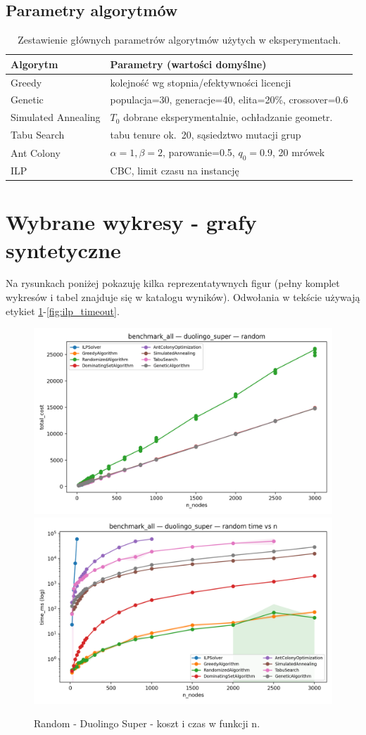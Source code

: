 \subsection*{Parametry algorytmów}
\begin{table}[h]
\centering
\begin{tabular}{@{}ll@{}}
\toprule
Algorytm & Parametry (wartości domyślne) \\
\midrule
Greedy & kolejność wg stopnia/efektywności licencji \\
Genetic & populacja=30, generacje=40, elita=20\%, crossover=0.6 \\
Simulated Annealing & $T_0$ dobrane eksperymentalnie, ochładzanie geometr. \\
Tabu Search & tabu tenure ok.~20, sąsiedztwo mutacji grup \\
Ant Colony & $\alpha=1,\beta=2$, parowanie=0.5, $q_0=0.9$, 20 mrówek \\
ILP & CBC, limit czasu na instancję \\
\bottomrule
\end{tabular}
\caption{Zestawienie głównych parametrów algorytmów użytych w eksperymentach.}
\label{tab:algo_params}
\end{table}

\section{Wybrane wykresy - grafy syntetyczne}
Na rysunkach poniżej pokazuję kilka reprezentatywnych figur (pełny komplet wykresów i tabel znajduje się w katalogu wyników). Odwołania w tekście używają etykiet \ref{fig:random_duo_cost_time}-\ref{fig:ilp_timeout}.

\begin{figure}[h]
  \centering
  \includegraphics[width=0.48\linewidth]{assets/figures/ba_random_duo_cost_vs_n.png}
  \includegraphics[width=0.48\linewidth]{assets/figures/ba_random_duo_time_vs_n.png}
  \caption{Random - Duolingo Super - koszt i czas w funkcji n.}
  \label{fig:random_duo_cost_time}
\end{figure}

